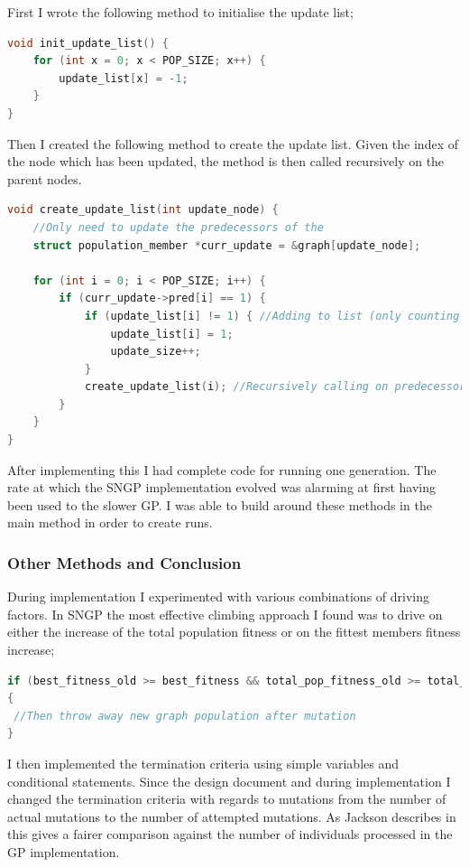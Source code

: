 \documentclass[a4paper,10.5pt]{article}
\begin{document}
First I wrote the following method to initialise the update list;


\begin{lstlisting}[language=C]
void init_update_list() {
	for (int x = 0; x < POP_SIZE; x++) {
		update_list[x] = -1;
	}
}
\end{lstlisting}

Then I created the following method to create the update list. Given the index of the node which has been updated, the method is then called recursively on the parent nodes.
\begin{lstlisting}[language=C]
void create_update_list(int update_node) {
	//Only need to update the predecessors of the 
	struct population_member *curr_update = &graph[update_node];

	for (int i = 0; i < POP_SIZE; i++) {
		if (curr_update->pred[i] == 1) {
			if (update_list[i] != 1) { //Adding to list (only counting repeated nodes once)
				update_list[i] = 1;
				update_size++;
			}
			create_update_list(i); //Recursively calling on predecessors
		}
	}
}
\end{lstlisting}

After implementing this I had complete code for running one generation. The rate at which the SNGP implementation evolved was alarming at first having been used to the slower GP. I was able to build around these methods in the main method in order to create runs.
\subsubsection{Other Methods and Conclusion}
During implementation I experimented with various combinations of driving factors. In SNGP the most effective climbing approach I found was to drive on either the increase of the total population fitness or on the fittest members fitness increase;
\begin{lstlisting}[language=C]
if (best_fitness_old >= best_fitness && total_pop_fitness_old >= total_pop_fitness)
{
 //Then throw away new graph population after mutation
}
\end{lstlisting}

I then implemented the termination criteria using simple variables and conditional statements. Since the design document and during implementation I changed the termination criteria with regards to mutations from the number of actual mutations to the number of attempted mutations. As Jackson describes in \cite{jacksonsngp} this gives a fairer comparison against the number of individuals processed in the GP implementation.
\end{document}
